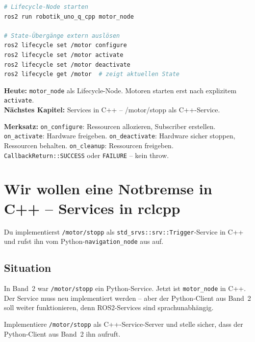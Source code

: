 \begin{lstlisting}[language=bash]
# Lifecycle-Node starten
ros2 run robotik_uno_q_cpp motor_node

# State-Übergänge extern auslösen
ros2 lifecycle set /motor configure
ros2 lifecycle set /motor activate
ros2 lifecycle set /motor deactivate
ros2 lifecycle get /motor  # zeigt aktuellen State
\end{lstlisting}

\begin{projektBox}
\textbf{Heute:} \texttt{motor\_node} als Lifecycle-Node.
Motoren starten erst nach explizitem \texttt{activate}.\\
\textbf{Nächstes Kapitel:} Services in C++ -- /motor/stopp als C++-Service.
\end{projektBox}

\begin{merksatzBox}
\textbf{Merksatz:}
\texttt{on\_configure}: Ressourcen allozieren, Subscriber erstellen.
\texttt{on\_activate}: Hardware freigeben.
\texttt{on\_deactivate}: Hardware sicher stoppen, Ressourcen behalten.
\texttt{on\_cleanup}: Ressourcen freigeben.
\texttt{CallbackReturn::SUCCESS} oder \texttt{FAILURE} -- kein throw.
\end{merksatzBox}


\chapter{Wir wollen eine Notbremse in C++ –
  Services in rclcpp}

\begin{lernziele}
Du implementierst \texttt{/motor/stopp} als \texttt{std\_srvs::srv::Trigger}-Service
in C++ und rufst ihn vom Python-\texttt{navigation\_node} aus auf.
\end{lernziele}

\section{Situation}

In Band~2 war \texttt{/motor/stopp} ein Python-Service.
Jetzt ist \texttt{motor\_node} in C++.
Der Service muss neu implementiert werden --
aber der Python-Client aus Band~2 soll weiter funktionieren,
denn ROS2-Services sind sprachunabhängig.

\begin{aufgabeBox}
Implementiere \texttt{/motor/stopp} als C++-Service-Server
und stelle sicher, dass der Python-Client aus Band~2 ihn aufruft.
\end{aufgabeBox}

